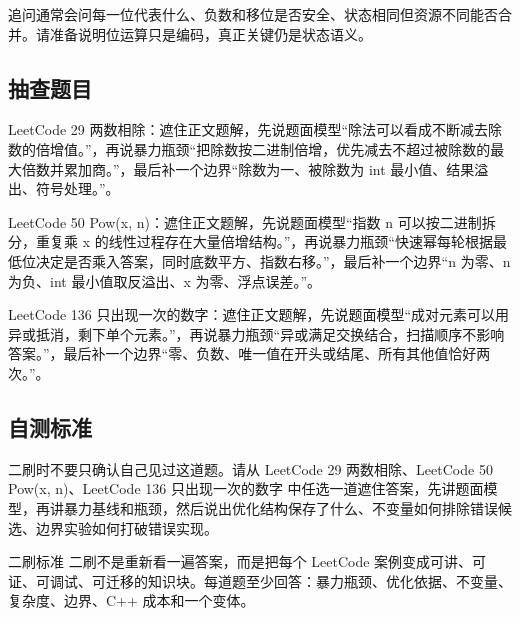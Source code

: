 追问通常会问每一位代表什么、负数和移位是否安全、状态相同但资源不同能否合并。请准备说明位运算只是编码，真正关键仍是状态语义。

\subsection{抽查题目}

LeetCode 29 两数相除：遮住正文题解，先说题面模型“除法可以看成不断减去除数的倍增值。”，再说暴力瓶颈“把除数按二进制倍增，优先减去不超过被除数的最大倍数并累加商。”，最后补一个边界“除数为一、被除数为 int 最小值、结果溢出、符号处理。”。

LeetCode 50 Pow(x, n)：遮住正文题解，先说题面模型“指数 n 可以按二进制拆分，重复乘 x 的线性过程存在大量倍增结构。”，再说暴力瓶颈“快速幂每轮根据最低位决定是否乘入答案，同时底数平方、指数右移。”，最后补一个边界“n 为零、n 为负、int 最小值取反溢出、x 为零、浮点误差。”。

LeetCode 136 只出现一次的数字：遮住正文题解，先说题面模型“成对元素可以用异或抵消，剩下单个元素。”，再说暴力瓶颈“异或满足交换结合，扫描顺序不影响答案。”，最后补一个边界“零、负数、唯一值在开头或结尾、所有其他值恰好两次。”。

\subsection{自测标准}

二刷时不要只确认自己见过这道题。请从 LeetCode 29 两数相除、LeetCode 50 Pow(x, n)、LeetCode 136 只出现一次的数字 中任选一道遮住答案，先讲题面模型，再讲暴力基线和瓶颈，然后说出优化结构保存了什么、不变量如何排除错误候选、边界实验如何打破错误实现。

\begin{principlebox}{二刷标准}
二刷不是重新看一遍答案，而是把每个 LeetCode 案例变成可讲、可证、可调试、可迁移的知识块。每道题至少回答：暴力瓶颈、优化依据、不变量、复杂度、边界、C++ 成本和一个变体。
\end{principlebox}
